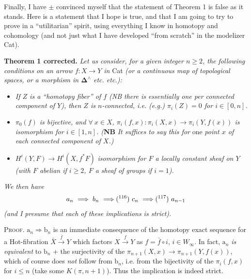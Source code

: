 Finally, I have $\pm$ convinced myself that the statement of Theorem 1 is false as it stands. Here is a statement that I hope is true, and that I am going to try to prove in a ``utilitarian'' spirit, using everything I know in homotopy and cohomology (and not just what I have developed ``from scratch'' in the modelizer Cat). %

\textbf{Theorem 1 corrected.} \textit{Let us consider, for a given integer $n \geq 2$, the following conditions on an arrow $f : X \longrightarrow Y$ in} Cat \textit{(or a continuous map of topological spaces, or a morphism in $\mathbf{\Delta}^\wedge$ etc. etc.):}

\begin{itemize}
\item[$a_n$)] \textit{If $Z$ is a ``homotopy fiber'' of $f$ (NB there is essentially one per connected component of $Y$), then $Z$ is $n$-connected, i.e.}
\textit{(e.g.) $\pi_i(Z) = 0$ for $i \in [0,n]$.}

\item[$b_n$)] \textit{$\pi_0(f)$ is bijective, and $\forall\ x \in X$, $\pi_i(f,x) : \pi_i(X,x) \longrightarrow \pi_i(Y,f(x))$ is} \textit{isomorphism for $i \in [1,n]$. (}\textbf{NB} \textit{It suffices to say this for} \textup{one} \textit{point $x$ of each connected component of $X$.)}

\item[$c_n$)] $H^i(Y,F) \longrightarrow H^i(X,f^*F)$ \textit{isomorphism for $F$ a locally constant sheaf on $Y$ (with $F$ abelian if $i \geq 2$, $F$ a sheaf of groups if $i = 1$).}
\end{itemize}

\textit{We then have}
\[
a_n \ \Longrightarrow\ b_n \ \Longrightarrow \text{(\footnotemark[116])}\ c_n \ \Longrightarrow \text{(\footnotemark[117])}\ a_{n-1}
\]
%
%
\textit{(and I presume that each of these implications is strict).}

\textsc{Proof}. $\mathrm{a}_n \Longrightarrow \mathrm{b}_n$ is an immediate consequence of the homotopy exact sequence for a Hot-fibration $\bar{X} \xrightarrow{\bar{f}} Y$ which factors $X \xrightarrow{f} Y$ as $f = \bar{f} \circ i$, $i \in W_\infty$. In fact, $\mathrm{a}_n$ \textit{is equivalent} to $\mathrm{b}_n$ + the surjectivity of the $\pi_{n+1}(X,x) \longrightarrow \pi_{n+1}(Y,f(x))$, which of course does \textit{not} follow from $\mathrm{b}_n$, i.e. from the bijectivity of the $\pi_i(f,x)$ for $i \leq n$ (take some $K(\pi,n+1)$). Thus the implication is indeed strict.